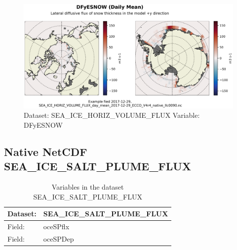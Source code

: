 \begin{figure}[H]
\centering
\includegraphics[scale=0.55]{../images/plots/native_plots/Sea-Ice_and_Snow_Horizontal_Volume_Fluxes/DFyESNOW.png}
\caption{Dataset: SEA\_ICE\_HORIZ\_VOLUME\_FLUX Variable: DFyESNOW}
\label{tab:table-SEA_ICE_HORIZ_VOLUME_FLUX_DFyESNOW-Plot}
\end{figure}
\pagebreak
\subsection{Native NetCDF SEA\_ICE\_SALT\_PLUME\_FLUX}
\newp
\begin{longtable}{|p{}|p{}|}
\caption{Variables in the dataset SEA\_ICE\_SALT\_PLUME\_FLUX}
\label{tab:table-SEA_ICE_SALT_PLUME_FLUX-fields} \\ 
\hline \endhead \hline \endfoot
\rowcolor{lightgray} \textbf{Dataset:} & \textbf{SEA\_ICE\_SALT\_PLUME\_FLUX} \\ \hline
Field: &oceSPflx \\ \hline
Field: &oceSPDep \\ \hline
\end{longtable}

\pagebreak

